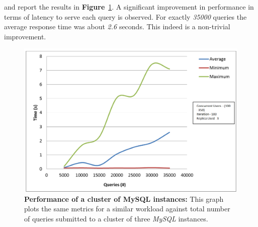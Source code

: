 \documentclass[12pt]{article}
\begin{document}
and report the results in \textbf{Figure}~\ref{fig:scaling}. A significant improvement 
in performance in terms of latency to serve each query is observed.
For exactly \emph{35000} queries the average response time was about \emph{2.6}
seconds. This indeed is a non-trivial improvement.  
\begin{figure}[H] 
\centering
\includegraphics[scale=0.45]{Images/graph_scaling.PNG}
\caption{\textbf{Performance of a cluster of MySQL instances:} This graph plots
the same metrics for a similar workload against total number of queries
submitted to a cluster of three \emph{MySQL} instances. } 
\label{fig:scaling}
\end{figure} 
\end{document}
